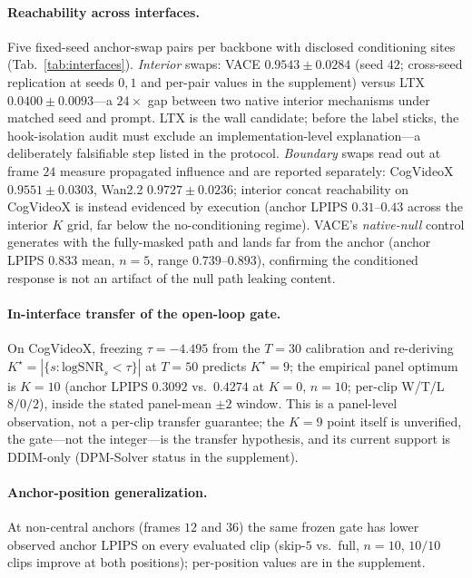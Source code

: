 \documentclass[letterpaper]{article}
\newcommand{\lsnr}{\mathrm{logSNR}}
\begin{document}
\paragraph{Reachability across interfaces.}
Five fixed-seed anchor-swap pairs per backbone with disclosed conditioning
sites (Tab.~\ref{tab:interfaces}). \emph{Interior} swaps: VACE
$0.9543{\pm}0.0284$ (seed $42$; cross-seed replication at seeds $0,1$ and
per-pair values in the supplement) versus LTX $0.0400{\pm}0.0093$---a $24\times$ gap
between two native interior mechanisms under matched seed and prompt. LTX is
the wall candidate; before the label sticks, the hook-isolation audit must
exclude an implementation-level explanation---a deliberately falsifiable
step listed in the protocol. \emph{Boundary} swaps read out at frame $24$
measure propagated influence and are reported separately: CogVideoX
$0.9551{\pm}0.0303$, Wan2.2 $0.9727{\pm}0.0236$; interior concat
reachability on CogVideoX is instead evidenced by execution (anchor LPIPS
$0.31$--$0.43$ across the interior $K$ grid, far below the
no-conditioning regime). VACE's \emph{native-null} control generates with
the fully-masked path and lands far from the anchor (anchor LPIPS $0.833$
mean, $n{=}5$, range $0.739$--$0.893$), confirming the conditioned
response is not an artifact of the null path leaking content.

\paragraph{In-interface transfer of the open-loop gate.}
On CogVideoX, freezing $\tau{=}-4.495$ from the $T{=}30$ calibration and
re-deriving $K^\star=|\{s:\lsnr_s<\tau\}|$ at $T{=}50$ predicts
$K^\star{=}9$; the empirical panel optimum is $K{=}10$ (anchor LPIPS
$0.3092$ vs.\ $0.4274$ at $K{=}0$, $n{=}10$; per-clip W/T/L $8/0/2$),
inside the stated panel-mean
$\pm2$ window. This is a panel-level observation, not a per-clip transfer
guarantee; the $K{=}9$ point itself is unverified, the gate---not the
integer---is the transfer hypothesis, and its current support is
DDIM-only (DPM-Solver status in the supplement).

\paragraph{Anchor-position generalization.}
At non-central anchors (frames $12$ and $36$) the same frozen gate has
lower observed anchor LPIPS on every evaluated clip (skip-$5$ vs.\ full,
$n{=}10$, $10/10$ clips improve at both positions); per-position values
are in the supplement.
\end{document}
